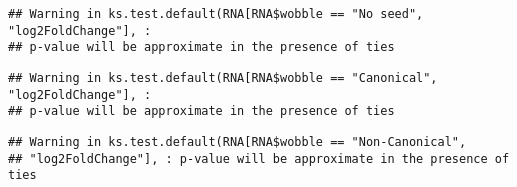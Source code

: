 \documentclass[
]{article}
\newenvironment{Shaded}{\begin{snugshade}}{\end{snugshade}}
\newcommand{\FunctionTok}[1]{\textcolor[rgb]{0.13,0.29,0.53}{\textbf{#1}}}
\newcommand{\NormalTok}[1]{#1}
\newcommand{\OtherTok}[1]{\textcolor[rgb]{0.56,0.35,0.01}{#1}}
\newcommand{\SpecialCharTok}[1]{\textcolor[rgb]{0.81,0.36,0.00}{\textbf{#1}}}
\newcommand{\StringTok}[1]{\textcolor[rgb]{0.31,0.60,0.02}{#1}}
\begin{document}
\begin{verbatim}
## Warning in ks.test.default(RNA[RNA$wobble == "No seed", "log2FoldChange"], :
## p-value will be approximate in the presence of ties
\end{verbatim}

\begin{Shaded}
\end{Shaded}

\begin{verbatim}
## Warning in ks.test.default(RNA[RNA$wobble == "Canonical", "log2FoldChange"], :
## p-value will be approximate in the presence of ties
\end{verbatim}

\begin{Shaded}
\end{Shaded}

\begin{verbatim}
## Warning in ks.test.default(RNA[RNA$wobble == "Non-Canonical",
## "log2FoldChange"], : p-value will be approximate in the presence of ties
\end{verbatim}

\begin{Shaded}
\end{Shaded}
\end{document}
